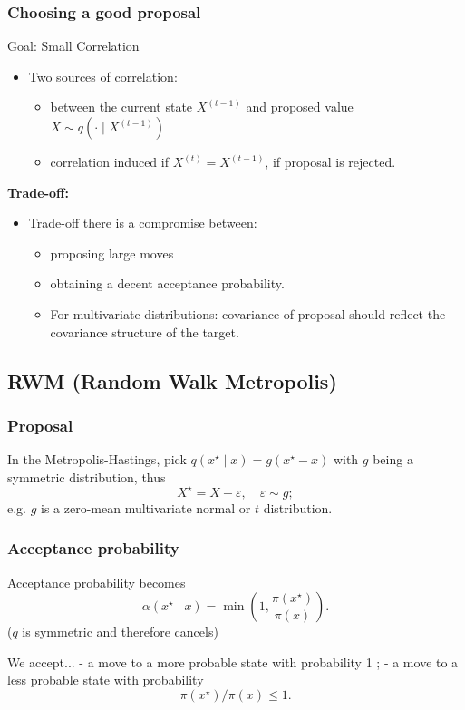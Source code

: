 \documentclass{article}
\begin{document}
\subsubsection{Choosing a good proposal}
Goal: Small Correlation
\begin{itemize}
    \item Two sources of correlation:
    \begin{itemize}
        \item between the current state $X^{(t-1)}$ and proposed value $X \sim q\left(\cdot \mid X^{(t-1)}\right)$
        \item correlation induced if $X^{(t)}=X^{(t-1)}$, if proposal is rejected.
    \end{itemize}
\end{itemize}
\textbf{Trade-off:}
\begin{itemize}
    \item  Trade-off there is a compromise between:
    \begin{itemize}
        \item  proposing large moves
        \item obtaining a decent acceptance probability.
        \item For multivariate distributions: covariance of proposal should reflect the covariance structure of the target.
    \end{itemize}
\end{itemize}


\subsection{RWM (Random Walk Metropolis)}
\subsubsection{Proposal} 
In the Metropolis-Hastings, pick $q\left(x^{\star} \mid x\right)=g\left(x^{\star}-x\right)$ with $g$ being a symmetric distribution, thus
$$
X^{\star}=X+\varepsilon, \quad \varepsilon \sim g ;
$$
e.g. $g$ is a zero-mean multivariate normal or $t$ distribution.
\subsubsection{Acceptance probability }
Acceptance probability becomes
$$
\alpha\left(x^{\star} \mid x\right)=\min \left(1, \frac{\pi\left(x^{\star}\right)}{\pi(x)}\right) .
$$ ($q$ is symmetric and therefore cancels)

We accept...
- a move to a more probable state with probability 1 ;
- a move to a less probable state with probability
$$
\pi\left(x^{\star}\right) / \pi(x) \leq 1 .
$$
\end{document}
